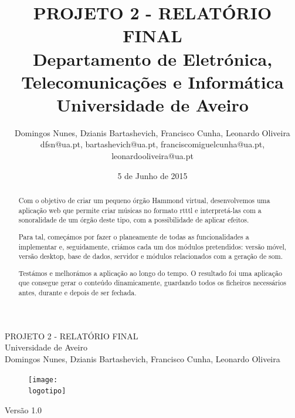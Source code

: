 \documentclass{report}
\begin{document}
%
\def\titulo{PROJETO 2 - RELATÓRIO FINAL}
\def\data{5 de Junho de 2015}
\def\autores{Domingos Nunes, Dzianis Bartashevich, Francisco Cunha, Leonardo Oliveira}
\def\autorescontactos{dfsn@ua.pt, bartashevich@ua.pt, franciscomiguelcunha@ua.pt, leonardooliveira@ua.pt}
\def\versao{Versão 1.0}
\def\departamento{Departamento de Eletrónica, Telecomunicações e Informática}
\def\empresa{Universidade de Aveiro}
\def\logotipo{images/ua.pdf}
%
%
\begin{titlepage}

\begin{center}
%
\vspace*{50mm}
%
{\Huge \titulo}\\ 
%
\vspace{10mm}
%
{\Large \empresa}\\
%
\vspace{10mm}
%
{\LARGE \autores}\\ 
%
%
\vspace{30mm}
%
\begin{figure}[h]
\center
\texttt{[image: \\logotipo]}
\end{figure}
%
\vspace{20mm}
\end{center}
%
\begin{flushright}
\versao
\end{flushright}
\end{titlepage}

%
%
%
%
\title{%
{\Huge\textbf{\titulo}}\\
{\Large \departamento\\ \empresa}
}
%
\author{%
    \autores \\
    \autorescontactos
}
%
\date{\data}
%
\maketitle
%
%

\begin{abstract}

Com o objetivo de criar um pequeno órgão Hammond virtual, desenvolvemos uma aplicação web que permite criar músicas no formato \ac{rtttl} e interpretá-las com a sonoralidade de um órgão deste tipo, com a possibilidade de aplicar efeitos.

Para tal, começámos por fazer o planeamente de todas as funcionalidades a implementar e, seguidamente, criámos cada um dos módulos pretendidos: versão móvel, versão desktop, base de dados, servidor e módulos relacionados com a geração de som.

Testámos e melhorámos a aplicação ao longo do tempo. O resultado foi uma aplicação que consegue gerar o conteúdo dinamicamente, guardando todos os ficheiros necessários antes, durante e depois de ser fechada.

\end{abstract}
\end{document}
